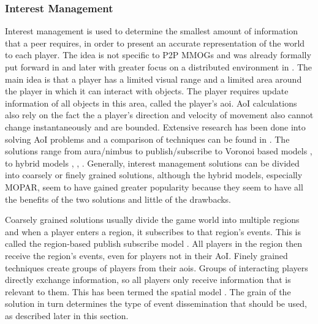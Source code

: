 \documentclass[journal,oneside,a4paper,onecolumn]{IEEEtran}
\begin{document}
\subsubsection{Interest Management}
Interest management is used to determine the smallest amount of information that a peer requires, in order to present an accurate representation of the world to each player. The idea is not specific to P2P MMOGs and was already formally put forward in \cite{First_IM} and later with greater focus on a distributed environment in \cite{Whang_agent_based_IM}. The main idea is that a player has a limited visual range and a limited area around the player in which it can interact with objects. The player requires update information of all objects in this area, called the player's \ac{aoi}. AoI calculations also rely on the fact the a player's direction and velocity of movement also cannot change instantaneously and are bounded. Extensive research has been done into solving AoI problems and a comparison of techniques can be found in \cite{Boulanger_IM_compare}. The solutions range from aura/nimbus \cite{Benford_spatial_IM} to publish/subscribe \cite{mercury_publish_subscribe} to Voronoi based models \cite{Hu_voronoi_IM}, \cite{Buyukkaya_voronoi_state_management} to hybrid models \cite{hybrid_IM}, \cite{MOPAR}, \cite{fan_mediator_paper}. Generally, interest management solutions can be divided into coarsely or finely grained solutions, although the hybrid models, especially MOPAR, seem to have gained greater popularity because they seem to have all the benefits of the two solutions and little of the drawbacks.

Coarsely grained solutions usually divide the game world into multiple regions and when a player enters a region, it subscribes to that region's events. This is called the region-based publish subscribe model \cite{Fan_deisgn_issues_p2p}. All players in the region then receive the region's events, even for players not in their AoI. Finely grained techniques create groups of players from their \acp{aoi}. Groups of interacting players directly exchange information, so all players only receive information that is relevant to them. This has been termed the spatial model \cite{Fan_deisgn_issues_p2p}. The grain of the solution in turn determines the type of event dissemination that should be used, as described later in this section.

\end{document}
